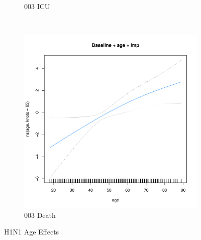 \documentclass[12pt,twoside]{article}
\begin{document}
\begin{figure}[h]
{\begin{subfigure}{.49\linewidth}
                \caption{003 ICU}
        \end{subfigure}\\
        \begin{subfigure}{.49\linewidth}
                \includegraphics[width=\textwidth, page=1]{003Death_H1N1}
                \caption{003 Death}
        \end{subfigure}

        } 
        \caption{H1N1 Age Effects}\label{reduced}

\par\bigskip
\par\bigskip
\par\bigskip
\par\bigskip


\end{figure}
\end{document}

